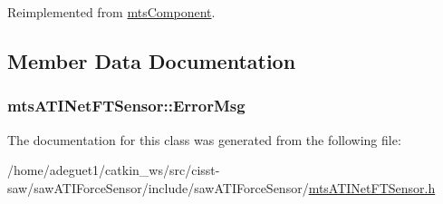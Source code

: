 Reimplemented from \hyperlink{classmts_component_aaf28f0262b44eb6866e10089a02fa6e4}{mts\-Component}.



\subsection{Member Data Documentation}
\hypertarget{classmts_a_t_i_net_f_t_sensor_a1fa47a15ff38ba74dfad51fce4d504bf}{
\subsubsection[{Error\-Msg}]{ mts\-A\-T\-I\-Net\-F\-T\-Sensor\-::\-Error\-Msg}}\label{classmts_a_t_i_net_f_t_sensor_a1fa47a15ff38ba74dfad51fce4d504bf}


The documentation for this class was generated from the following file\-:\begin{DoxyCompactItemize}
\item 
/home/adeguet1/catkin\-\_\-ws/src/cisst-\/saw/saw\-A\-T\-I\-Force\-Sensor/include/saw\-A\-T\-I\-Force\-Sensor/\hyperlink{mts_a_t_i_net_f_t_sensor_8h}{mts\-A\-T\-I\-Net\-F\-T\-Sensor.\-h}\end{DoxyCompactItemize}
